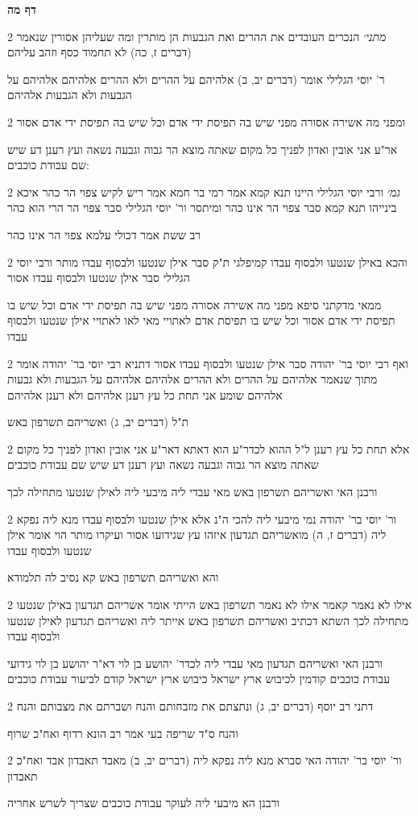 \documentclass[12pt, openany]{book}
\newcommand{\sethebfont}{
\fontsize{10.5pt}{21.0pt} \selectfont
}
\newcommand{\twocol}[1]{
	{\sethebfont \begin{multicols}{2}
			#1
	\end{multicols}}	
}
\newcommand{\sectname}{}
\newcommand{\newsection}[1]{
	\addcontentsline{toc}{section}{#1}
	\renewcommand{\sectname}{#1}	
	\vspace{-\baselineskip}
	\begin{center}
		\textbf{%
\fontsize{16pt}{16pt}\selectfont
			#1}
	\end{center}
	\vspace{-\baselineskip}
	\nopagebreak
}
\begin{document}
\newsection{דף מה}
\twocol{{\large\emph{מתני׳}} הנכרים העובדים את ההרים ואת הגבעות הן מותרין ומה שעליהן אסורין שנאמר (דברים ז, כה) לא תחמוד כסף וזהב עליהם
\par ר' יוסי הגלילי אומר (דברים יב, ב) אלהיהם על ההרים ולא ההרים אלהיהם אלהיהם על הגבעות ולא הגבעות אלהיהם}
\twocol{ומפני מה אשירה אסורה מפני שיש בה תפיסת ידי אדם וכל שיש בה תפיסת ידי אדם אסור
\par אר"ע אני אובין ואדון לפניך כל מקום שאתה מוצא הר גבוה וגבעה נשאה ועץ רענן דע שיש שם עבודת כוכבים:}
\twocol{{\large\emph{גמ׳}} ורבי יוסי הגלילי היינו תנא קמא אמר רמי בר חמא אמר ריש לקיש צפוי הר כהר איכא בינייהו תנא קמא סבר צפוי הר אינו כהר ומיתסר ור' יוסי הגלילי סבר צפוי הר הרי הוא כהר
\par רב ששת אמר דכולי עלמא צפוי הר אינו כהר}
\twocol{והכא באילן שנטעו ולבסוף עבדו קמיפלגי ת"ק סבר אילן שנטעו ולבסוף עבדו מותר ורבי יוסי הגלילי סבר אילן שנטעו ולבסוף עבדו אסור
\par ממאי מדקתני סיפא מפני מה אשירה אסורה מפני שיש בה תפיסת ידי אדם וכל שיש בו תפיסת ידי אדם אסור וכל שיש בו תפיסת אדם לאתויי מאי לאו לאתויי אילן שנטעו ולבסוף עבדו}
\twocol{ואף רבי יוסי בר' יהודה סבר אילן שנטעו ולבסוף עבדו אסור דתניא רבי יוסי בר' יהודה אומר מתוך שנאמר אלהיהם על ההרים ולא ההרים אלהיהם אלהיהם על הגבעות ולא גבעות אלהיהם שומע אני תחת כל עץ רענן אלהיהם ולא רענן אלהיהם
\par ת"ל (דברים יב, ג) ואשריהם תשרפון באש}
\twocol{אלא תחת כל עץ רענן ל"ל ההוא לכדר"ע הוא דאתא דאר"ע אני אובין ואדון לפניך כל מקום שאתה מוצא הר גבוה וגבעה נשאה ועץ רענן דע שיש שם עבודת כוכבים
\par ורבנן האי ואשריהם תשרפון באש מאי עבדי ליה מיבעי ליה לאילן שנטעו מתחילה לכך}
\twocol{ור' יוסי בר' יהודה נמי מיבעי ליה להכי ה"נ אלא אילן שנטעו ולבסוף עבדו מנא ליה נפקא ליה (דברים ז, ה) מואשריהם תגדעון איזהו עץ שגידועו אסור ועיקרו מותר הוי אומר אילן שנטעו ולבסוף עבדו
\par והא ואשריהם תשרפון באש קא נסיב לה תלמודא}
\twocol{אילו לא נאמר קאמר אילו לא נאמר תשרפון באש הייתי אומר אשריהם תגדעון באילן שנטעו מתחילה לכך השתא דכתיב ואשריהם תשרפון באש אייתר ליה ואשריהם תגדעון לאילן שנטעו ולבסוף עבדו
\par ורבנן האי ואשריהם תגדעון מאי עבדי ליה לכדר' יהושע בן לוי דא"ר יהושע בן לוי גידועי עבודת כוכבים קודמין לכיבוש ארץ ישראל כיבוש ארץ ישראל קודם לביעור עבודת כוכבים}
\twocol{דתני רב יוסף (דברים יב, ג) ונתצתם את מזבחותם והנח ושברתם את מצבותם והנח
\par והנח ס"ד שריפה בעי אמר רב הונא רדוף ואח"כ שרוף}
\twocol{ור' יוסי בר' יהודה האי סברא מנא ליה נפקא ליה (דברים יב, ב) מאבד תאבדון אבד ואח"כ תאבדון
\par ורבנן הא מיבעי ליה לעוקר עבודת כוכבים שצריך לשרש אחריה}
\end{document}

